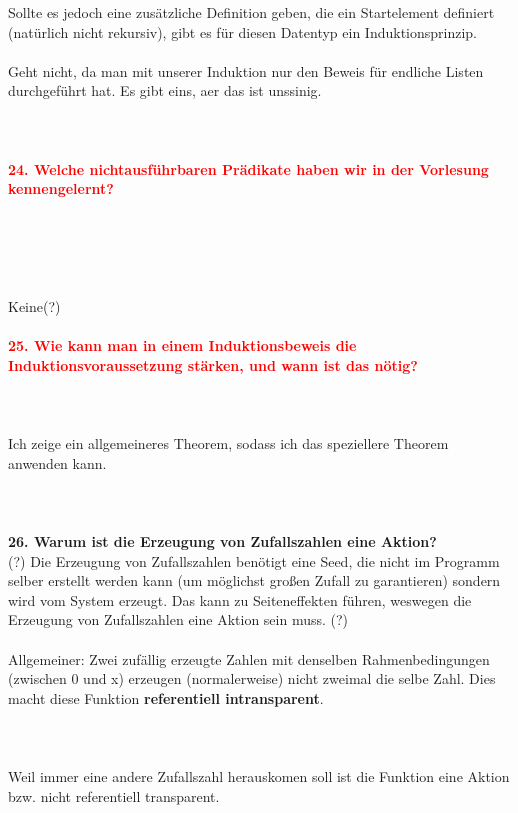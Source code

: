 \documentclass{article}
\begin{document}
Sollte es jedoch eine zusätzliche Definition geben, die ein Startelement definiert (natürlich nicht rekursiv), gibt es für diesen Datentyp ein Induktionsprinzip.
\\
\\
Geht nicht, da man mit unserer Induktion nur den Beweis für endliche Listen durchgeführt hat. Es gibt eins, aer das ist unssinig.
\\
\\
\\
\\
\textcolor{red}{\textbf{24. Welche nichtausführbaren Prädikate haben wir in der Vorlesung kennengelernt?}}
\\
\\
\\
\\
\\
\\
Keine(?)
\\
\\
\textcolor{red}{\textbf{25. Wie kann man in einem Induktionsbeweis die Induktionsvoraussetzung stärken, und wann ist das nötig?}}
\\
\\
\\
\\
Ich zeige ein allgemeineres Theorem, sodass ich das speziellere Theorem anwenden kann.
\\
\\
\\
\\
\textbf{26. Warum ist die Erzeugung von Zufallszahlen eine Aktion?}
\\
(?) Die Erzeugung von Zufallszahlen benötigt eine Seed, die nicht im Programm selber erstellt werden kann (um möglichst großen Zufall zu garantieren) sondern wird vom System erzeugt. Das kann zu Seiteneffekten führen, weswegen die Erzeugung von Zufallszahlen eine Aktion sein muss. (?)\\
\\
Allgemeiner: Zwei zufällig erzeugte Zahlen mit denselben Rahmenbedingungen (zwischen 0 und x) erzeugen (normalerweise) nicht zweimal die selbe Zahl. Dies macht diese Funktion \textbf{referentiell intransparent}.\\
\\
\\
\\
Weil immer eine andere Zufallszahl herauskomen soll ist die Funktion eine Aktion bzw. nicht referentiell transparent.
\\
\\
\end{document}
